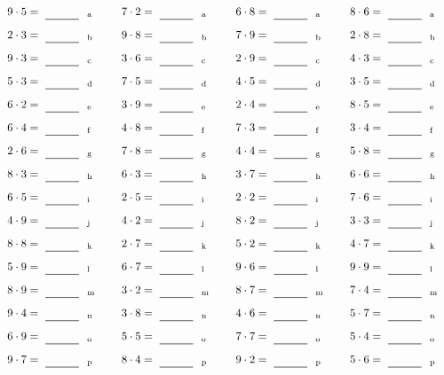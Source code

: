 \documentclass
[
  draft    = true,
  fontsize = 11pt,
  parskip  = half-
]
{scrartcl}
\begin{document}
\par\vfill\par
\begin{align*}
    \pline{9\cdot5}&=\rline{a}
  & \pline{7\cdot2}&=\rline{a}
  & \pline{6\cdot8}&=\rline{a}
  & \pline{8\cdot6}&=\rline{a} \\[1ex]
    \pline{2\cdot3}&=\rline{b}
  & \pline{9\cdot8}&=\rline{b}
  & \pline{7\cdot9}&=\rline{b}
  & \pline{2\cdot8}&=\rline{b} \\[1ex]
    \pline{9\cdot3}&=\rline{c}
  & \pline{3\cdot6}&=\rline{c}
  & \pline{2\cdot9}&=\rline{c}
  & \pline{4\cdot3}&=\rline{c} \\[1ex]
    \pline{5\cdot3}&=\rline{d}
  & \pline{7\cdot5}&=\rline{d}
  & \pline{4\cdot5}&=\rline{d}
  & \pline{3\cdot5}&=\rline{d} \\[1ex]
    \pline{6\cdot2}&=\rline{e}
  & \pline{3\cdot9}&=\rline{e}
  & \pline{2\cdot4}&=\rline{e}
  & \pline{8\cdot5}&=\rline{e} \\[1ex]
    \pline{6\cdot4}&=\rline{f}
  & \pline{4\cdot8}&=\rline{f}
  & \pline{7\cdot3}&=\rline{f}
  & \pline{3\cdot4}&=\rline{f} \\[1ex]
    \pline{2\cdot6}&=\rline{g}
  & \pline{7\cdot8}&=\rline{g}
  & \pline{4\cdot4}&=\rline{g}
  & \pline{5\cdot8}&=\rline{g} \\[1ex]
    \pline{8\cdot3}&=\rline{h}
  & \pline{6\cdot3}&=\rline{h}
  & \pline{3\cdot7}&=\rline{h}
  & \pline{6\cdot6}&=\rline{h} \\[1ex]
    \pline{6\cdot5}&=\rline{i}
  & \pline{2\cdot5}&=\rline{i}
  & \pline{2\cdot2}&=\rline{i}
  & \pline{7\cdot6}&=\rline{i} \\[1ex]
    \pline{4\cdot9}&=\rline{j}
  & \pline{4\cdot2}&=\rline{j}
  & \pline{8\cdot2}&=\rline{j}
  & \pline{3\cdot3}&=\rline{j} \\[1ex]
    \pline{8\cdot8}&=\rline{k}
  & \pline{2\cdot7}&=\rline{k}
  & \pline{5\cdot2}&=\rline{k}
  & \pline{4\cdot7}&=\rline{k} \\[1ex]
    \pline{5\cdot9}&=\rline{l}
  & \pline{6\cdot7}&=\rline{l}
  & \pline{9\cdot6}&=\rline{l}
  & \pline{9\cdot9}&=\rline{l} \\[1ex]
    \pline{8\cdot9}&=\rline{m}
  & \pline{3\cdot2}&=\rline{m}
  & \pline{8\cdot7}&=\rline{m}
  & \pline{7\cdot4}&=\rline{m} \\[1ex]
    \pline{9\cdot4}&=\rline{n}
  & \pline{3\cdot8}&=\rline{n}
  & \pline{4\cdot6}&=\rline{n}
  & \pline{5\cdot7}&=\rline{n} \\[1ex]
    \pline{6\cdot9}&=\rline{o}
  & \pline{5\cdot5}&=\rline{o}
  & \pline{7\cdot7}&=\rline{o}
  & \pline{5\cdot4}&=\rline{o} \\[1ex]
    \pline{9\cdot7}&=\rline{p}
  & \pline{8\cdot4}&=\rline{p}
  & \pline{9\cdot2}&=\rline{p}
  & \pline{5\cdot6}&=\rline{p}
\end{align*}
\end{document}
